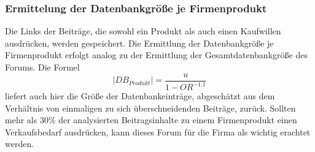 \subsubsection{Ermittelung der Datenbankgröße je Firmenprodukt}
Die Links der Beiträge, die sowohl ein Produkt als auch einen Kaufwillen ausdrücken, werden gespeichert. Die Ermittlung der Datenbankgröße je Firmenprodukt erfolgt analog zu der Ermittlung der Gesamtdatenbankgröße des Forums. Die Formel \[|DB_{Produkt}| = \frac{u}{1-OR^{-1.1}}\] \cite{lu2008efficient} liefert auch hier die Größe der Datenbankeinträge, abgeschätzt aus dem Verhältnis von einmaligen zu sich überschneidenden Beiträge, zurück.
Sollten mehr als 30\% der analysierten Beitragsinhalte zu einem Firmenprodukt einen Verkaufsbedarf ausdrücken, kann dieses Forum für die Firma als wichtig erachtet werden.

